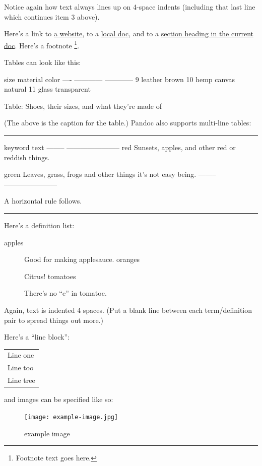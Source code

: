 \documentclass[11pt,twoside,makeidx,hidelinks,]{memoir}
\begin{document}
Notice again how text always lines up on 4-space indents (including
that last line which continues item 3 above).

Here's a link to \href{http://foo.bar}{a website}, to a \href{local-doc.html}{local
doc}, and to a \hyperlink{an-h2-header}{section heading in the current
doc}. Here's a footnote \footnote{Footnote text goes here.}.

Tables can look like this:

size  material      color
----  ------------  ------------
9     leather       brown
10    hemp canvas   natural
11    glass         transparent

Table: Shoes, their sizes, and what they're made of

(The above is the caption for the table.) Pandoc also supports
multi-line tables:

\pfbreak
keyword   text
--------  -----------------------
red       Sunsets, apples, and
          other red or reddish
          things.

green     Leaves, grass, frogs
          and other things it's
          not easy being.
--------  -----------------------

A horizontal rule follows.

\pfbreak

Here's a definition list:

\begin{description}
\item[apples] Good for making applesauce.
oranges



Citrus!
tomatoes



There's no ``e'' in tomatoe.
\end{description}

Again, text is indented 4 spaces. (Put a blank line between each
term/definition pair to spread things out more.)

Here's a ``line block'':

\begin{longtable}{|l|}
\hline
Line one\\
Line too\\
Line tree\\
\hline
\end{longtable}

and images can be specified like so:

\begin{figure}
\begin{center}
\texttt{[image: example-image.jpg]}
\end{center}
\caption{example image}

\end{figure}
\end{document}
